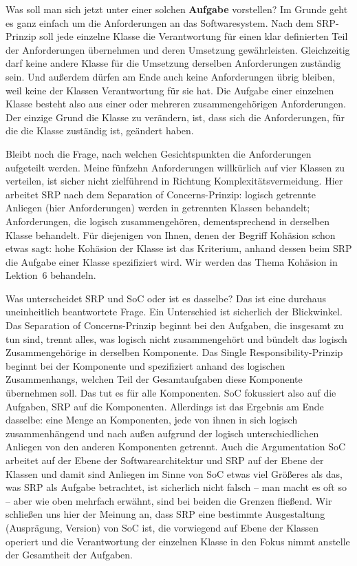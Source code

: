 \vspace{1.8mm} %

Was soll man sich jetzt unter einer solchen \textbf{Aufgabe} vorstellen? Im Grunde geht es ganz einfach um die Anforderungen an das Softwaresystem. Nach dem SRP-Prinzip soll jede einzelne Klasse die Verantwortung für einen klar definierten Teil der Anforderungen übernehmen und deren Umsetzung gewährleisten. Gleichzeitig darf keine andere Klasse für die Umsetzung derselben Anforderungen zuständig sein. Und außerdem dürfen am Ende auch keine Anforderungen übrig bleiben, weil keine der Klassen Verantwortung für sie hat. Die Aufgabe einer einzelnen Klasse besteht also aus einer oder mehreren zusammengehörigen Anforderungen. Der einzige Grund die Klasse zu verändern, ist, dass sich die Anforderungen, für die die Klasse zuständig ist, geändert haben. 

\vspace{1.8mm} %

Bleibt noch die Frage, nach welchen Gesichtspunkten die Anforderungen aufgeteilt werden. Meine fünfzehn Anforderungen willkürlich auf vier Klassen zu verteilen, ist sicher nicht zielführend in Richtung Komplexitätsvermeidung. Hier arbeitet SRP nach dem Separation of Concerns-Prinzip: logisch getrennte Anliegen (hier Anforderungen) werden in getrennten Klassen behandelt; Anforderungen, die logisch zusammengehören, dementsprechend in derselben Klasse behandelt. Für diejenigen von Ihnen, denen der Begriff Kohäsion schon etwas sagt: hohe Kohäsion der Klasse ist das Kriterium, anhand dessen beim SRP die Aufgabe einer Klasse spezifiziert wird. Wir werden das Thema Kohäsion in Lektion~6 behandeln.

\vspace{2mm} %

Was unterscheidet SRP und SoC 
oder ist es dasselbe? Das ist eine durchaus uneinheitlich beantwortete Frage. Ein Unterschied ist sicherlich der Blickwinkel. Das Separation of Concerns-Prinzip beginnt bei den Aufgaben, die insgesamt zu tun sind, trennt alles, was logisch nicht zusammengehört und bündelt das logisch Zusammengehörige in derselben Komponente. Das Single Responsibility-Prinzip beginnt bei der Komponente und spezifiziert anhand des logischen Zusammenhangs, welchen Teil der Gesamtaufgaben diese Komponente übernehmen soll. Das tut es für alle Komponenten. SoC fokussiert also auf die Aufgaben, SRP auf die Komponenten. Allerdings ist das Ergebnis am Ende dasselbe: eine Menge an Komponenten, jede von ihnen in sich logisch zusammenhängend und nach außen aufgrund der logisch unterschiedlichen Anliegen von den anderen Komponenten getrennt. Auch die Argumen\-tation SoC arbeitet auf der Ebene der Softwarearchitektur und SRP auf der Ebene der Klassen und damit sind Anliegen im Sinne von SoC etwas viel Größeres als das, was SRP als Aufgabe betrachtet, ist sicherlich nicht falsch -- man macht es oft so -- aber wie oben mehrfach erwähnt, sind bei beiden die Grenzen fließend. Wir schließen uns hier der Meinung an, dass SRP eine bestimmte Ausgestaltung (Ausprägung, Version) von SoC ist, die vorwiegend auf Ebene der Klassen operiert und die Verantwortung der einzelnen Klasse in den Fokus nimmt anstelle der Gesamtheit der Aufgaben. 
